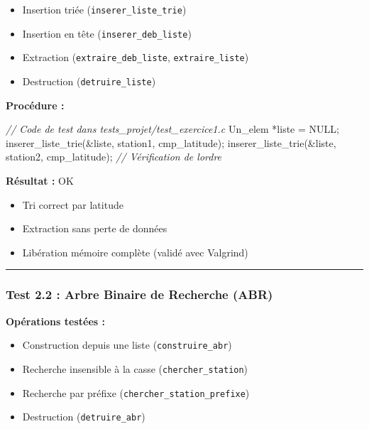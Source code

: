 \documentclass[
]{article}
\newcommand{\OK}{OK~\twemoji{white_check_mark}}
\newcommand{\OK}{OK~\twemoji{white_check_mark}}
\newenvironment{Shaded}{}{}
\newcommand{\CommentTok}[1]{\textcolor[rgb]{0.38,0.63,0.69}{\textit{#1}}}
\newcommand{\NormalTok}[1]{#1}
\newcommand{\OperatorTok}[1]{\textcolor[rgb]{0.40,0.40,0.40}{#1}}
\providecommand{\tightlist}{%
  \setlength{\itemsep}{0pt}\setlength{\parskip}{0pt}}
\begin{document}
\begin{itemize}
\tightlist
\item
  Insertion triée (\texttt{inserer\_liste\_trie})
\item
  Insertion en tête (\texttt{inserer\_deb\_liste})
\item
  Extraction (\texttt{extraire\_deb\_liste}, \texttt{extraire\_liste})
\item
  Destruction (\texttt{detruire\_liste})
\end{itemize}

\textbf{Procédure :}

\begin{Shaded}
\begin{Highlighting}[]
\CommentTok{// Code de test dans tests\_projet/test\_exercice1.c}
\NormalTok{Un\_elem }\OperatorTok{*}\NormalTok{liste }\OperatorTok{=}\NormalTok{ NULL}\OperatorTok{;}
\NormalTok{inserer\_liste\_trie}\OperatorTok{(\&}\NormalTok{liste}\OperatorTok{,}\NormalTok{ station1}\OperatorTok{,}\NormalTok{ cmp\_latitude}\OperatorTok{);}
\NormalTok{inserer\_liste\_trie}\OperatorTok{(\&}\NormalTok{liste}\OperatorTok{,}\NormalTok{ station2}\OperatorTok{,}\NormalTok{ cmp\_latitude}\OperatorTok{);}
\CommentTok{// Vérification de l\textquotesingle{}ordre}
\end{Highlighting}
\end{Shaded}

\textbf{Résultat :} \OK

\begin{itemize}
\tightlist
\item
  Tri correct par latitude
\item
  Extraction sans perte de données
\item
  Libération mémoire complète (validé avec Valgrind)
\end{itemize}

\begin{center}\rule{0.5\linewidth}{0.5pt}\end{center}

\subsubsection{Test 2.2 : Arbre Binaire de Recherche
(ABR)}\label{test-2.2-arbre-binaire-de-recherche-abr}

\textbf{Opérations testées :}

\begin{itemize}
\tightlist
\item
  Construction depuis une liste (\texttt{construire\_abr})
\item
  Recherche insensible à la casse (\texttt{chercher\_station})
\item
  Recherche par préfixe (\texttt{chercher\_station\_prefixe})
\item
  Destruction (\texttt{detruire\_abr})
\end{itemize}
\end{document}
